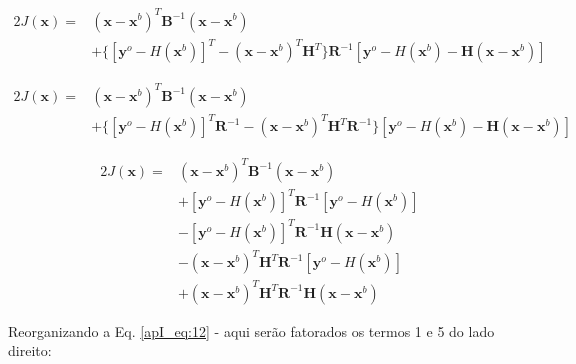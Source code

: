 \begin{equation}
  \label{apI_eq:10}
  \begin{aligned}
    2J(\mathbf{x}) = {} & (\mathbf{x} - \mathbf{x}^{b})^{T}\mathbf{B}^{-1}(\mathbf{x} - \mathbf{x}^{b}) \\
    & + \lbrace{[\mathbf{y}^{o} - \textit{H}(\mathbf{x}^{b})]^{T} - (\mathbf{x} - \mathbf{x}^{b})^{T}\mathbf{H}^{T}\rbrace}\mathbf{R}^{-1}[\mathbf{y}^{o} - \textit{H}(\mathbf{x}^{b}) - \mathbf{H}(\mathbf{x} - \mathbf{x}^{b})]
  \end{aligned}
\end{equation}

\begin{equation}
  \label{apI_eq:11}
  \begin{aligned}
    2J(\mathbf{x}) = {} & (\mathbf{x} - \mathbf{x}^{b})^{T}\mathbf{B}^{-1}(\mathbf{x} - \mathbf{x}^{b}) \\
    & + \lbrace{[\mathbf{y}^{o} - \textit{H}(\mathbf{x}^{b})]^{T}\mathbf{R}^{-1} - (\mathbf{x} - \mathbf{x}^{b})^{T}\mathbf{H}^{T}\mathbf{R}^{-1}\rbrace}[\mathbf{y}^{o} - \textit{H}(\mathbf{x}^{b}) - \mathbf{H}(\mathbf{x} - \mathbf{x}^{b})]
  \end{aligned}
\end{equation}

\begin{equation}
  \label{apI_eq:12}
  \begin{aligned}
    2J(\mathbf{x}) = {} & (\mathbf{x} - \mathbf{x}^{b})^{T}\mathbf{B}^{-1}(\mathbf{x} - \mathbf{x}^{b}) \\
    & + [\mathbf{y}^{o} - \textit{H}(\mathbf{x}^{b})]^{T}\mathbf{R}^{-1}[\mathbf{y}^{o} - \textit{H}(\mathbf{x}^{b})] \\ 
                & - [\mathbf{y}^{o} - \textit{H}(\mathbf{x}^{b})]^{T}\mathbf{R}^{-1}\mathbf{H}(\mathbf{x} - \mathbf{x}^{b}) \\
                & - (\mathbf{x} - \mathbf{x}^{b})^{T}\mathbf{H}^{T}\mathbf{R}^{-1}[\mathbf{y}^{o} - \textit{H}(\mathbf{x}^{b})] \\ 
                & + (\mathbf{x} - \mathbf{x}^{b})^{T}\mathbf{H}^{T}\mathbf{R}^{-1}\mathbf{H}(\mathbf{x} - \mathbf{x}^{b})
  \end{aligned}  
\end{equation}

Reorganizando a Eq. \ref{apI_eq:12} - aqui serão fatorados os termos 1 e 5 do lado direito:

